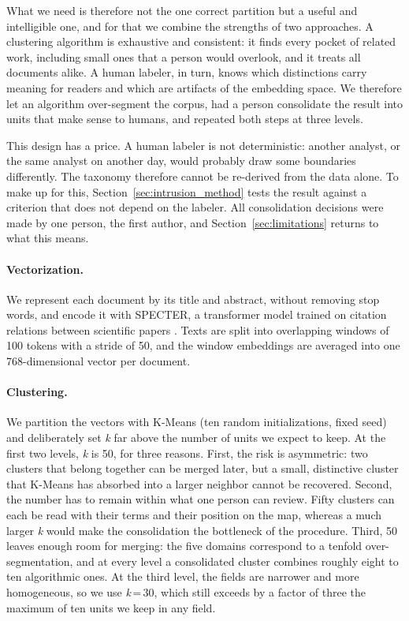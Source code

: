\documentclass[10pt,twocolumn,a4paper]{article}
\begin{document}
	What we need is therefore not the one correct partition but a useful and intelligible one, and for that we combine the strengths of two approaches. A clustering algorithm is exhaustive and consistent: it finds every pocket of related work, including small ones that a person would overlook, and it treats all documents alike. A human labeler, in turn, knows which distinctions carry meaning for readers and which are artifacts of the embedding space. We therefore let an algorithm over-segment the corpus, had a person consolidate the result into units that make sense to humans, and repeated both steps at three levels.
	
	This design has a price. A human labeler is not deterministic: another analyst, or the same analyst on another day, would probably draw some boundaries differently. The taxonomy therefore cannot be re-derived from the data alone. To make up for this, Section~\ref{sec:intrusion_method} tests the result against a criterion that does not depend on the labeler. All consolidation decisions were made by one person, the first author, and Section~\ref{sec:limitations} returns to what this means.
	
	\paragraph{Vectorization.} We represent each document by its title and abstract, without removing stop words, and encode it with SPECTER, a transformer model trained on citation relations between scientific papers \parencite{cohan2020specter}. Texts are split into overlapping windows of 100 tokens with a stride of 50, and the window embeddings are averaged into one 768-dimensional vector per document.
	
	\paragraph{Clustering.} We partition the vectors with K-Means (ten random initializations, fixed seed) and deliberately set \textit{k} far above the number of units we expect to keep. At the first two levels, \textit{k} is 50, for three reasons. First, the risk is asymmetric: two clusters that belong together can be merged later, but a small, distinctive cluster that K-Means has absorbed into a larger neighbor cannot be recovered. Second, the number has to remain within what one person can review. Fifty clusters can each be read with their terms and their position on the map, whereas a much larger \textit{k} would make the consolidation the bottleneck of the procedure. Third, 50 leaves enough room for merging: the five domains correspond to a tenfold over-segmentation, and at every level a consolidated cluster combines roughly eight to ten algorithmic ones. At the third level, the fields are narrower and more homogeneous, so we use \textit{k}\,=\,30, which still exceeds by a factor of three the maximum of ten units we keep in any field.
	
\end{document}

